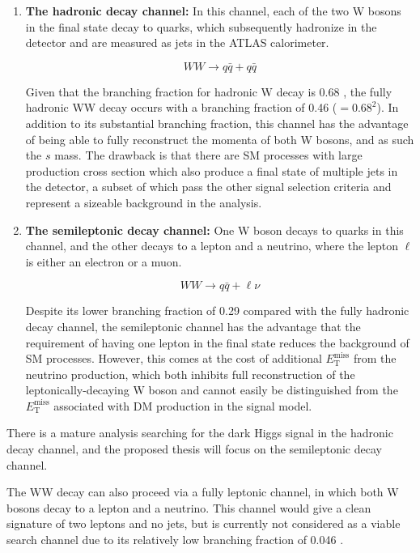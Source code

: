 \documentclass[12pt]{article}
\newcommand*{\met}{\ensuremath{E_\text{T}^\text{miss}} }
\begin{document}
\begin{enumerate}

\item \textbf{The hadronic decay channel:} In this channel, each of the two W bosons in the final state decay to quarks, which subsequently hadronize in the detector and are measured as jets in the ATLAS calorimeter.

\begin{equation}
\nonumber
WW \rightarrow q\bar{q}+q\bar{q}
\end{equation}

Given that the branching fraction for hadronic W decay is 0.68 \cite{PDG}, the fully hadronic WW decay occurs with a branching fraction of 0.46 ($=0.68^2$). In addition to its substantial branching fraction, this channel has the advantage of being able to fully reconstruct the momenta of both W bosons, and as such the $s$ mass. The drawback is that there are SM processes with large production cross section which also produce a final state of multiple jets in the detector, a subset of which pass the other signal selection criteria and represent a sizeable background in the analysis. 

\item \textbf{The semileptonic decay channel:} One W boson decays to quarks in this channel, and the other decays to a lepton and a neutrino, where the lepton $\ell$ is either an electron or a muon. 

\begin{equation}
\nonumber
WW \rightarrow q\bar{q}+\ell\nu
\end{equation}

Despite its lower branching fraction of 0.29 \cite{PDG} compared with the fully hadronic decay channel, the semileptonic channel has the advantage that the requirement of having one lepton in the final state reduces the background of SM processes. However, this comes at the cost of additional \met from the neutrino production, which both inhibits full reconstruction of the leptonically-decaying W boson and cannot easily be distinguished from the \met associated with DM production in the signal model. 

\end{enumerate}

There is a mature analysis searching for the dark Higgs signal in the hadronic decay channel, and the proposed thesis will focus on the semileptonic decay channel. 

The WW decay can also proceed via a fully leptonic channel, in which both W bosons decay to a lepton and a neutrino. This channel would give a clean signature of two leptons and no jets, but is currently not considered as a viable search channel due to its relatively low branching fraction of 0.046 \cite{PDG}.
\end{document}
